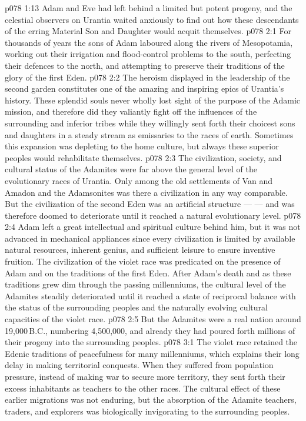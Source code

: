 \vs p078 1:13 Adam and Eve had left behind a limited but potent progeny, and the celestial observers on Urantia waited anxiously to find out how these descendants of the erring Material Son and Daughter would acquit themselves.
\vs p078 2:1 For thousands of years the sons of Adam laboured along the rivers of Mesopotamia, working out their irrigation and flood\hyp{}control problems to the south, perfecting their defences to the north, and attempting to preserve their traditions of the glory of the first Eden.
\vs p078 2:2 The heroism displayed in the leadership of the second garden constitutes one of the amazing and inspiring epics of Urantia’s history. These splendid souls never wholly lost sight of the purpose of the Adamic mission, and therefore did they valiantly fight off the influences of the surrounding and inferior tribes while they willingly sent forth their choicest sons and daughters in a steady stream as emissaries to the races of earth. Sometimes this expansion was depleting to the home culture, but always these superior peoples would rehabilitate themselves.
\vs p078 2:3 The civilization, society, and cultural status of the Adamites were far above the general level of the evolutionary races of Urantia. Only among the old settlements of Van and Amadon and the Adamsonites was there a civilization in any way comparable. But the civilization of the second Eden was an artificial structure ---  ---  and was therefore doomed to deteriorate until it reached a natural evolutionary level.
\vs p078 2:4 Adam left a great intellectual and spiritual culture behind him, but it was not advanced in mechanical appliances since every civilization is limited by available natural resources, inherent genius, and sufficient leisure to ensure inventive fruition. The civilization of the violet race was predicated on the presence of Adam and on the traditions of the first Eden. After Adam’s death and as these traditions grew dim through the passing millenniums, the cultural level of the Adamites steadily deteriorated until it reached a state of reciprocal balance with the status of the surrounding peoples and the naturally evolving cultural capacities of the violet race.
\vs p078 2:5 But the Adamites were a real nation around 19,000\,B.C., numbering 4,500,000, and already they had poured forth millions of their progeny into the surrounding peoples.
\vs p078 3:1 The violet race retained the Edenic traditions of peacefulness for many millenniums, which explains their long delay in making territorial conquests. When they suffered from population pressure, instead of making war to secure more territory, they sent forth their excess inhabitants as teachers to the other races. The cultural effect of these earlier migrations was not enduring, but the absorption of the Adamite teachers, traders, and explorers was biologically invigorating to the surrounding peoples.
